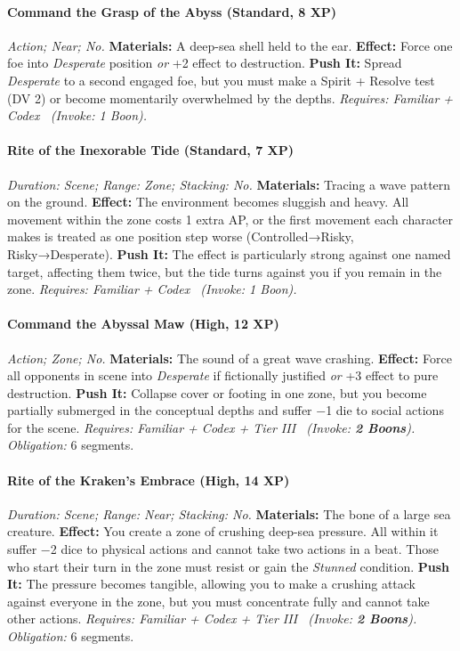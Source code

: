 \paragraph{Command the Grasp of the Abyss (Standard, 8 XP)} \emph{Action; Near; No.}
\textbf{Materials:} A deep-sea shell held to the ear.
\textbf{Effect:} Force one foe into \emph{Desperate} position \emph{or} +2 effect to destruction.
\textbf{Push It:} Spread \emph{Desperate} to a second engaged foe, but you must make a Spirit + Resolve test (DV 2) or become momentarily overwhelmed by the depths.
\emph{Requires: Familiar + Codex \ (\textit{Invoke:} 1 Boon).}
\paragraph{Rite of the Inexorable Tide (Standard, 7 XP)} \emph{Duration: Scene; Range: Zone; Stacking: No.}
\textbf{Materials:} Tracing a wave pattern on the ground.
\textbf{Effect:} The environment becomes sluggish and heavy. All movement within the zone costs 1 extra AP, or the first movement each character makes is treated as one position step worse (Controlled→Risky, Risky→Desperate).
\textbf{Push It:} The effect is particularly strong against one named target, affecting them twice, but the tide turns against you if you remain in the zone.
\emph{Requires: Familiar + Codex \ (\textit{Invoke:} 1 Boon).}
\paragraph{Command the Abyssal Maw (High, 12 XP)} \emph{Action; Zone; No.}
\textbf{Materials:} The sound of a great wave crashing.
\textbf{Effect:} Force all opponents in scene into \emph{Desperate} if fictionally justified \emph{or} +3 effect to pure destruction.
\textbf{Push It:} Collapse cover or footing in one zone, but you become partially submerged in the conceptual depths and suffer −1 die to social actions for the scene.
\emph{Requires: Familiar + Codex + Tier III \ (\textit{Invoke:} \textbf{2 Boons}).}
\emph{Obligation:} 6 segments.

\paragraph{Rite of the Kraken's Embrace (High, 14 XP)} \emph{Duration: Scene; Range: Near; Stacking: No.}
\textbf{Materials:} The bone of a large sea creature.
\textbf{Effect:} You create a zone of crushing deep-sea pressure. All within it suffer −2 dice to physical actions and cannot take two actions in a beat. Those who start their turn in the zone must resist or gain the \emph{Stunned} condition.
\textbf{Push It:} The pressure becomes tangible, allowing you to make a crushing attack against everyone in the zone, but you must concentrate fully and cannot take other actions.
\emph{Requires: Familiar + Codex + Tier III \ (\textit{Invoke:} \textbf{2 Boons}).}
\emph{Obligation:} 6 segments.

